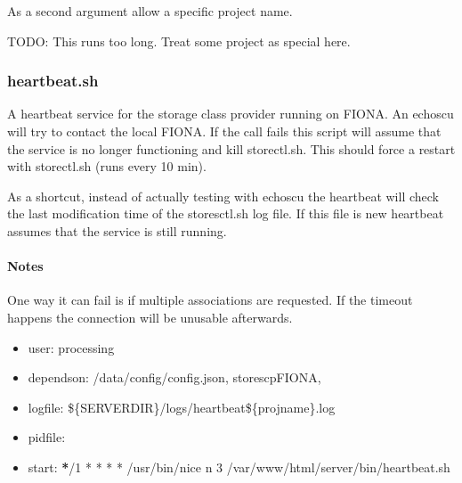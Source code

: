 \documentclass[letterpaper,10pt,english]{sphinxmanual}
\begin{document}
\sphinxAtStartPar
As a second argument allow a specific project name.

\sphinxAtStartPar
TODO: This runs too long. Treat some project as special here.

\sphinxstepscope


\subsubsection{heartbeat.sh}
\label{\detokenize{Architecture/scripts/heartbeat:heartbeat-sh}}\label{\detokenize{Architecture/scripts/heartbeat::doc}}
\sphinxAtStartPar
A heartbeat service for the storage class provider running on FIONA. An echoscu will try to contact the local FIONA. If the call fails this script will assume that the service is no longer functioning and kill storectl.sh. This should force a restart with storectl.sh (runs every 10 min).

\sphinxAtStartPar
As a shortcut, instead of actually testing with echoscu the heartbeat will check the last modification time of the storesctl.sh log file. If this file is new heartbeat assumes that the service is still running.


\paragraph{Notes}
\label{\detokenize{Architecture/scripts/heartbeat:notes}}
\sphinxAtStartPar
One way it can fail is if multiple associations are requested. If the timeout happens the connection will be unusable afterwards.
\begin{itemize}
\item {} 
\sphinxAtStartPar
user: processing

\item {} 
\sphinxAtStartPar
depends\sphinxhyphen{}on:
\sphinxhyphen{} /data/config/config.json,
\sphinxhyphen{} storescpFIONA,

\item {} 
\sphinxAtStartPar
log\sphinxhyphen{}file:
\sphinxhyphen{} \$\{SERVERDIR\}/logs/heartbeat\$\{projname\}.log

\item {} 
\sphinxAtStartPar
pid\sphinxhyphen{}file:

\item {} 
\sphinxAtStartPar
start:
{\color{red}\bfseries{}*}/1 * * * * /usr/bin/nice \sphinxhyphen{}n 3 /var/www/html/server/bin/heartbeat.sh

\end{itemize}
\end{document}
